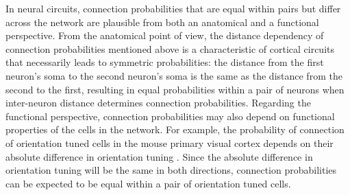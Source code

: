 

In neural circuits, connection probabilities that are equal within pairs but differ across the network are plausible from both an anatomical and a functional perspective. From the anatomical point of view, the distance dependency of connection probabilities mentioned above is a characteristic of cortical circuits that necessarily leads to symmetric probabilities: the distance from the first neuron's soma to the second neuron's soma is the same as the distance from the second to the first, resulting in equal probabilities within a pair of neurons when inter-neuron distance determines connection probabilities. Regarding the functional perspective, connection probabilities may also depend on functional properties of the cells in the network. For example, the probability of connection of orientation tuned cells in the mouse primary visual cortex depends on their absolute difference in orientation tuning \cite{Lee2016a, Ko2011}. Since the absolute difference in orientation tuning will be the same in both directions, connection probabilities can be expected to be equal within a pair of orientation tuned cells.


